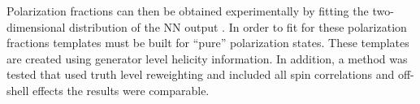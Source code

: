 Polarization fractions can then be obtained experimentally by fitting the two-dimensional distribution of the NN output \ctsNN.  
In order to fit for these polarization fractions templates must be built for ``pure'' polarization states. These
templates are created using generator level helicity information. In addition, a method was tested that used truth level reweighting and included all spin correlations and off-shell effects the results were comparable.
